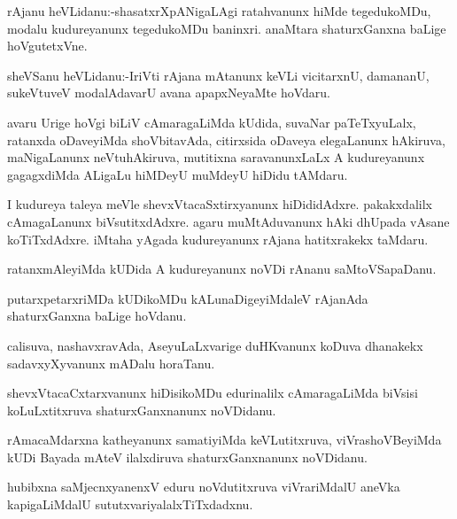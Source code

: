 \documentclass{article}
\begin{document}
\begin{mn}%
rAjanu heVLidanu:-shasatxrXpANigaLAgi ratahvanunx hiMde tegedukoMDu, modalu kudureyanunx 
tegedukoMDu baninxri. anaMtara shaturxGanxna baLige hoVgutetxVne.
\end{mn}

\begin{mn}%
sheVSanu heVLidanu:-IriVti rAjana mAtanunx keVLi vicitarxnU, damananU, sukeVtuveV 
modalAdavarU avana apapxNeyaMte hoVdaru.
\end{mn}

\begin{mn}%
avaru Urige hoVgi biLiV cAmaragaLiMda kUdida, suvaNar paTeTxyuLalx, ratanxda oDaveyiMda 
shoVbitavAda, citirxsida oDaveya elegaLanunx hAkiruva, maNigaLanunx neVtuhAkiruva, 
mutitixna saravanunxLaLx A kudureyanunx gagagxdiMda ALigaLu hiMDeyU muMdeyU hiDidu tAMdaru. 
\end{mn}

\begin{mn}%
I kudureya taleya meVle shevxVtacaSxtirxyanunx hiDididAdxre. pakakxdalilx cAmagaLanunx 
biVsutitxdAdxre. agaru muMtAduvanunx hAki dhUpada vAsane koTiTxdAdxre. iMtaha yAgada 
kudureyanunx rAjana hatitxrakekx taMdaru.
\end{mn}

\begin{mn}%
ratanxmAleyiMda kUDida A kudureyanunx noVDi rAnanu saMtoVSapaDanu.
\end{mn}

\begin{mn}%
putarxpetarxriMDa kUDikoMDu kALunaDigeyiMdaleV rAjanAda shaturxGanxna baLige hoVdanu.
\end{mn}

\begin{mn}%
calisuva, nashavxravAda, AseyuLaLxvarige duHKvanunx koDuva dhanakekx sadavxyXyvanunx mADalu 
horaTanu.
\end{mn}

\begin{mn}%
shevxVtacaCxtarxvanunx hiDisikoMDu edurinalilx cAmaragaLiMda biVsisi koLuLxtitxruva 
shaturxGanxnanunx noVDidanu.
\end{mn}

\begin{mn}%
rAmacaMdarxna katheyanunx samatiyiMda keVLutitxruva, viVrashoVBeyiMda kUDi Bayada mAteV 
ilalxdiruva shaturxGanxnanunx noVDidanu. 
\end{mn}

\begin{mn}%
hubibxna saMjecnxyanenxV eduru noVdutitxruva viVrariMdalU aneVka kapigaLiMdalU 
sututxvariyalalxTiTxdadxnu.
\end{mn}
\end{document}
